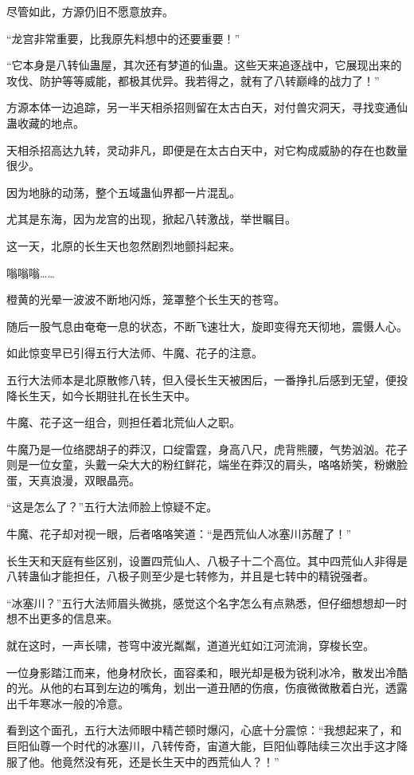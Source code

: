 \begin{this_body}
尽管如此，方源仍旧不愿意放弃。

“龙宫非常重要，比我原先料想中的还要重要！”

“它本身是八转仙蛊屋，其次还有梦道的仙蛊。这些天来追逐战中，它展现出来的攻伐、防护等等威能，都极其优异。我若得之，就有了八转巅峰的战力了！”

方源本体一边追踪，另一半天相杀招则留在太古白天，对付兽灾洞天，寻找变通仙蛊收藏的地点。

天相杀招高达九转，灵动非凡，即便是在太古白天中，对它构成威胁的存在也数量很少。

因为地脉的动荡，整个五域蛊仙界都一片混乱。

尤其是东海，因为龙宫的出现，掀起八转激战，举世瞩目。

这一天，北原的长生天也忽然剧烈地颤抖起来。

嗡嗡嗡……

橙黄的光晕一波波不断地闪烁，笼罩整个长生天的苍穹。

随后一股气息由奄奄一息的状态，不断飞速壮大，旋即变得充天彻地，震慑人心。

如此惊变早已引得五行大法师、牛魔、花子的注意。

五行大法师本是北原散修八转，但入侵长生天被困后，一番挣扎后感到无望，便投降长生天，如今长期驻扎在长生天中。

牛魔、花子这一组合，则担任着北荒仙人之职。

牛魔乃是一位络腮胡子的莽汉，口绽雷霆，身高八尺，虎背熊腰，气势汹汹。花子则是一位女童，头戴一朵大大的粉红鲜花，端坐在莽汉的肩头，咯咯娇笑，粉嫩脸蛋，天真浪漫，双眼晶亮。

“这是怎么了？”五行大法师脸上惊疑不定。

牛魔、花子却对视一眼，后者咯咯笑道：“是西荒仙人冰塞川苏醒了！”

长生天和天庭有些区别，设置四荒仙人、八极子十二个高位。其中四荒仙人非得是八转蛊仙才能担任，八极子则至少是七转修为，并且是七转中的精锐强者。

“冰塞川？”五行大法师眉头微挑，感觉这个名字怎么有点熟悉，但仔细想想却一时想不出更多的信息来。

就在这时，一声长啸，苍穹中波光粼粼，道道光虹如江河流淌，穿梭长空。

一位身影踏江而来，他身材欣长，面容柔和，眼光却是极为锐利冰冷，散发出冷酷的光。从他的右耳到左边的嘴角，划出一道丑陋的伤痕，伤痕微微散着白光，透露出千年寒冰一般的冷意。

看到这个面孔，五行大法师眼中精芒顿时爆闪，心底十分震惊：“我想起来了，和巨阳仙尊一个时代的冰塞川，八转传奇，宙道大能，巨阳仙尊陆续三次出手这才降服了他。他竟然没有死，还是长生天中的西荒仙人？！”


\end{this_body}
